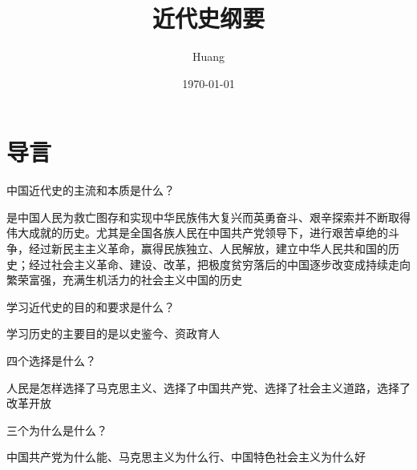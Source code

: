 \documentclass[lang=cn,10pt]{elegantbook}
\title{近代史纲要}
\author{ Huang}
\date{\today}
\begin{document}
	
	\maketitle
	\frontmatter
	
	\tableofcontents
	
	\mainmatter
	\chapter{导言}
	\begin{example}
		中国近代史的主流和本质是什么？
	\end{example}
	\begin{solution}
		是中国人民为救亡图存和实现中华民族伟大复兴而英勇奋斗、艰辛探索并不断取得伟大成就的历史。尤其是全国各族人民在中国共产党领导下，进行艰苦卓绝的斗争，经过新民主主义革命，赢得民族独立、人民解放，建立中华人民共和国的历史；经过社会主义革命、建设、改革，把极度贫穷落后的中国逐步改变成持续走向繁荣富强，充满生机活力的社会主义中国的历史
	\end{solution}
	\begin{example}
		学习近代史的目的和要求是什么？
	\end{example}
	\begin{solution}
		学习历史的主要目的是以史鉴今、资政育人
	\end{solution}
	\begin{example}
		四个选择是什么？
	\end{example}
	\begin{solution}
		人民是怎样选择了马克思主义、选择了中国共产党、选择了社会主义道路，选择了改革开放
	\end{solution}
	\begin{example}
		三个为什么是什么？
	\end{example}
	\begin{solution}
		中国共产党为什么能、马克思主义为什么行、中国特色社会主义为什么好
	\end{solution}
\end{document}
